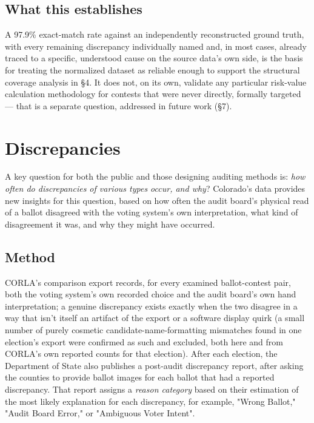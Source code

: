\subsection{What this establishes}

A 97.9\% exact-match rate against an independently reconstructed ground
truth, with every remaining discrepancy individually named and, in most
cases, already traced to a specific, understood cause on the source data's
own side, is the basis for treating the normalized dataset as reliable
enough to support the structural coverage analysis in §4. It does not, on
its own, validate any particular risk-value calculation methodology for
contests that were never directly, formally targeted — that is a separate
question, addressed in future work (§7).

\section{Discrepancies}

A key question for both the public and those designing auditing methods
is: \textit{how often do discrepancies of various types occur, and why}?
Colorado's data provides new insights for this question, based on
how often the audit board's physical read of a ballot disagreed with the voting system's own
interpretation, what kind of disagreement it was, and why they might have occurred.

\subsection{Method}

CORLA's comparison export records, for every examined ballot-contest pair,
both the voting system's own recorded choice and the audit board's own
hand interpretation; a genuine discrepancy exists exactly when the two
disagree in a way that isn't itself an artifact of the export or a
software display quirk (a small number of purely cosmetic candidate-name-formatting
mismatches found in one election's export were confirmed as such and
excluded, both here and from CORLA's own reported counts for that
election).
After each election, the Department of State also publishes a post-audit discrepancy report,
after asking the counties to provide ballot images for each ballot that had a reported
discrepancy.
That report assigns a \textit{reason category} based on their estimation
of the most likely explanation for each discrepancy, for
example, "Wrong Ballot," "Audit Board Error," or "Ambiguous Voter Intent".

